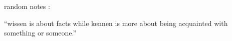 
random notes :

“wissen is  about facts while kennen is more about being acquainted with something or someone.”





%


